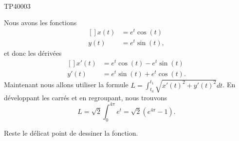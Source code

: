 \begin{corrige}{TP40003}

	Nous avons les fonctions
	\begin{equation}
		\begin{aligned}[]
			x(t)&= e^{t}\cos(t)\\
			y(t)&= e^{t}\sin(t),
		\end{aligned}
	\end{equation}
	et donc les dérivées
	\begin{equation}
		\begin{aligned}[]
			x'(t)&= e^{t}\cos(t)-e^t\sin(t)\\
			y'(t)&= e^{t}\sin(t)+e^t\cos(t).
		\end{aligned}
	\end{equation}
	Maintenant nous allons utiliser la formule $L=\int_{t_0}^{t_1}\sqrt{x'(t)^2+y'(t)^2}dt$. En développant les carrés et en regroupant, nous trouvons
	\begin{equation}
		L=\sqrt{2}\int_0^{4\pi} e^{t}=\sqrt{2}( e^{4\pi}-1).
	\end{equation}

	Reste le délicat point de dessiner la fonction.
	

\end{corrige}
